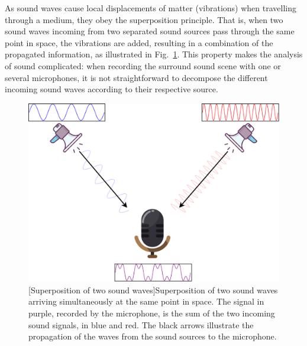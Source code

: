 As sound waves cause local displacements of matter (vibrations) when travelling through a medium, they obey the superposition principle. That is, when two sound waves incoming from two separated sound sources pass through the same point in space, the vibrations are added, resulting in a combination of the propagated information, as illustrated in Fig.~\ref{fig:superpositionPrinciple}. This property makes the analysis of sound complicated: when recording the surround sound scene with one or several microphones, it is not straightforward to decompose the different incoming sound waves according to their respective source.

\begin{figure}[t]
    \begin{center}
    \includegraphics[width=0.7\linewidth]{Images/chap1/superpositionPrinciple.png}
    [Superposition of two sound waves]{Superposition of two sound waves arriving simultaneously at the same point in space. The signal in purple, recorded by the microphone, is the sum of the two incoming sound signals, in blue and red. The black arrows illustrate the propagation of the waves from the sound sources to the microphone.}
    \label{fig:superpositionPrinciple}
    \end{center}
\end{figure}


